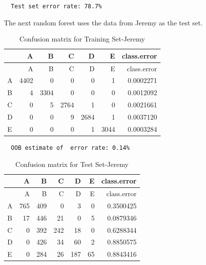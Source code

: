 \documentclass[12pt,twoside]{reedthesis}
\begin{document}
  \begin{verbatim}
  Test set error rate: 78.7%
  \end{verbatim}
  
  The next random forest uses the data from Jeremy as the test set.
  
  \begin{Shaded}
  \begin{Highlighting}[]
  \NormalTok{(}\NormalTok{)}
  
  \StringTok{ }\NormalTok{wl2[wl2$user_name ==}\StringTok{ }\NormalTok{subjects[}\NormalTok{], ]}
  \StringTok{ }\NormalTok{wl2[wl2$user_name !=}\StringTok{ }\NormalTok{subjects[}\NormalTok{], ]}
  \StringTok{ }\NormalTok{(} \NormalTok{OtherSubs5[, }\NormalTok{:}\NormalTok{], } 
                                  \NormalTok{Sub5[, }\NormalTok{:}\NormalTok{], }
                                  
                                  \NormalTok{)}
  \end{Highlighting}
  \end{Shaded}
  
  \begin{longtable}[c]{@{}lrrrrrr@{}}
  \caption{Confusion matrix for Training Set-Jeremy}\tabularnewline
  \toprule
  & A & B & C & D & E & class.error\tabularnewline
  \midrule
  \endfirsthead
  \toprule
  & A & B & C & D & E & class.error\tabularnewline
  \midrule
  \endhead
  A & 4402 & 0 & 0 & 0 & 1 & 0.0002271\tabularnewline
  B & 4 & 3304 & 0 & 0 & 0 & 0.0012092\tabularnewline
  C & 0 & 5 & 2764 & 1 & 0 & 0.0021661\tabularnewline
  D & 0 & 0 & 9 & 2684 & 1 & 0.0037120\tabularnewline
  E & 0 & 0 & 0 & 1 & 3044 & 0.0003284\tabularnewline
  \bottomrule
  \end{longtable}
  
  \begin{verbatim}
  OOB estimate of  error rate: 0.14%
  \end{verbatim}
  
  \begin{longtable}[c]{@{}lrrrrrr@{}}
  \caption{Confusion matrix for Test Set-Jeremy}\tabularnewline
  \toprule
  & A & B & C & D & E & class.error\tabularnewline
  \midrule
  \endfirsthead
  \toprule
  & A & B & C & D & E & class.error\tabularnewline
  \midrule
  \endhead
  A & 765 & 409 & 0 & 3 & 0 & 0.3500425\tabularnewline
  B & 17 & 446 & 21 & 0 & 5 & 0.0879346\tabularnewline
  C & 0 & 392 & 242 & 18 & 0 & 0.6288344\tabularnewline
  D & 0 & 426 & 34 & 60 & 2 & 0.8850575\tabularnewline
  E & 0 & 284 & 26 & 187 & 65 & 0.8843416\tabularnewline
  \bottomrule
  \end{longtable}
  
\end{document}
